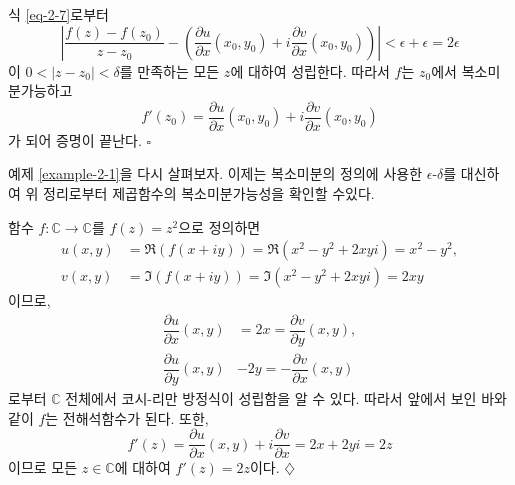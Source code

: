 식 \eqref{eq-2-7}로부터
\[
\left| \dfrac{f(z)-f(z_0)}{z-z_0} 
- \left( \dfrac{\partial u}{\partial x}(x_0,y_0) 
+ i \dfrac{\partial v}{\partial x}(x_0,y_0) \right) \right|
< \epsilon + \epsilon = 2\epsilon
\]
이 $0<|z-z_0|<\delta$를 만족하는 모든 $z$에 대하여 성립한다.
따라서 $f$는 $z_0$에서 복소미분가능하고
\[
f'(z_0) = \dfrac{\partial u}{\partial x}(x_0,y_0) 
+ i \dfrac{\partial v}{\partial x}(x_0,y_0) 
\]
가 되어 증명이 끝난다.
\hfill $\square$

예제 \ref{example-2-1}을 다시 살펴보자.
이제는 복소미분의 정의에 사용한 $\epsilon$-$\delta$를 대신하여
위 정리로부터 제곱함수의 복소미분가능성을 확인할 수있다.

\begin{salt_example} \label{example-2-7}
함수  $f:\mathbb C \to \mathbb C$를 $f(z) = z^2$으로 정의하면
\begin{align*}
u(x,y) &= \Re(f(x+iy)) = \Re(x^2-y^2+2xyi) = x^2-y^2, \\
v(x,y) &= \Im(f(x+iy)) = \Im(x^2-y^2+2xyi) = 2xy
\end{align*}
이므로, 
\begin{align*}
\dfrac{\partial u}{\partial x}(x,y) &= 2x = \dfrac{\partial v}{\partial y}(x,y), \\
\dfrac{\partial u}{\partial y}(x,y) & -2y = - \dfrac{\partial v}{\partial x}(x,y)
\end{align*}
로부터 $\mathbb C$ 전체에서 코시-리만 방정식이 성립함을 알 수 있다.
따라서 앞에서 보인 바와 같이 $f$는 전해석함수가 된다.
또한, 
\[
f'(z) = \dfrac{\partial u}{\partial x}(x,y) + i\dfrac{\partial v}{\partial x}
= 2x + 2yi = 2z
\]
이므로 모든 $z\in\mathbb C$에 대하여 $f'(z) = 2z$이다.
\hfill $\diamondsuit$
\end{salt_example}

